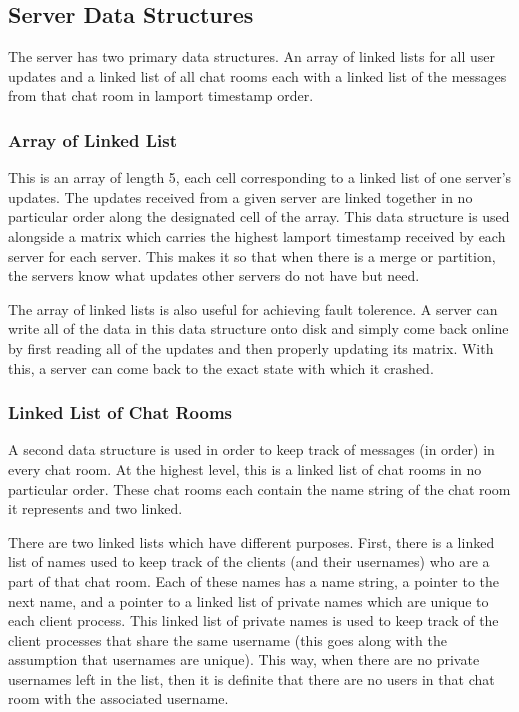 \documentclass[12pt,journal,compsoc]{IEEEtran}
\begin{document}
\subsection{Server Data Structures}
The server has two primary data structures. An array of linked lists for all user updates and a linked list of all chat rooms each with a linked list of the messages from that chat room in lamport timestamp order.

\subsubsection{Array of Linked List}
This is an array of length 5, each cell corresponding to a linked list of one server's updates. The updates received from a given server are linked together in no particular order along the designated cell of the array. This data structure is used alongside a matrix which carries the highest lamport timestamp received by each server for each server. This makes it so that when there is a merge or partition, the servers know what updates other servers do not have but need.

The array of linked lists is also useful for achieving fault tolerence. A server can write all of the data in this data structure onto disk and simply come back online by first reading all of the updates and then properly updating its matrix. With this, a server can come back to the exact state with which it crashed.


\subsubsection{Linked List of Chat Rooms}
A second data structure is used in order to keep track of messages (in order) in every chat room. At the highest level, this is a linked list of chat rooms in no particular order. These chat rooms each contain the name string of the chat room it represents and two linked.

There are two linked lists which have different purposes. First, there is a linked list of names used to keep track of the clients (and their usernames) who are a part of that chat room. Each of these names has a name string, a pointer to the next name, and a pointer to a linked list of private names which are unique to each client process. This linked list of private names is used to keep track of the client processes that share the same username (this goes along with the assumption that usernames are unique). This way, when there are no private usernames left in the list, then it is definite that there are no users in that chat room with the associated username.
\end{document}
